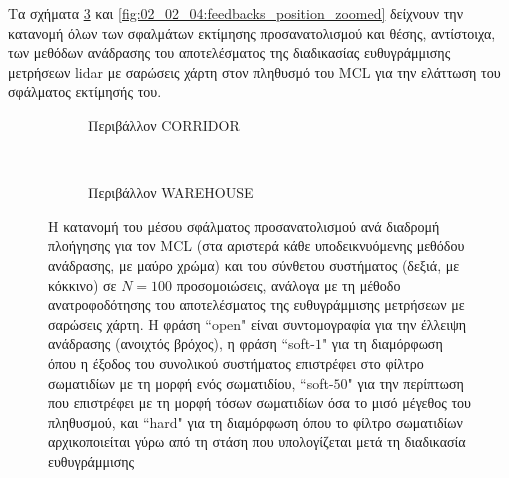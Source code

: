 Τα σχήματα \ref{fig:02_02_04:feedbacks_orientation_zoomed} και
\ref{fig:02_02_04:feedbacks_position_zoomed} δείχνουν την κατανομή όλων των
σφαλμάτων εκτίμησης προσανατολισμού και θέσης, αντίστοιχα, των μεθόδων ανάδρασης
του αποτελέσματος της διαδικασίας ευθυγράμμισης μετρήσεων lidar με σαρώσεις
χάρτη στον πληθυσμό του MCL για την ελάττωση του σφάλματος εκτίμησής του.

\begin{figure}
  \vspace{2cm}
  \begin{subfigure}{\linewidth}
  \hspace{-1.25cm}
    
    \vspace{0.3cm}
    \caption{Περιβάλλον CORRIDOR}
    \label{}
  \end{subfigure}\\
  \begin{subfigure}{\linewidth}\vspace{0.5cm}
    \hspace{-1.25cm}
    
    \vspace{0.3cm}
    \caption{Περιβάλλον WAREHOUSE}
    \label{}
    \end{subfigure}
\caption{\small Η κατανομή του μέσου σφάλματος προσανατολισμού ανά διαδρομή
         πλοήγησης για τον MCL (στα αριστερά κάθε υποδεικνυόμενης μεθόδου
         ανάδρασης, με μαύρο χρώμα) και του σύνθετου συστήματος (δεξιά, με
         κόκκινο) σε $N=100$ προσομοιώσεις, ανάλογα με τη μέθοδο
         ανατροφοδότησης του αποτελέσματος της ευθυγράμμισης μετρήσεων με
         σαρώσεις χάρτη. Η φράση ``open" είναι συντομογραφία για την έλλειψη
         ανάδρασης (ανοιχτός βρόχος), η φράση ``soft-$1$" για τη διαμόρφωση
         όπου η έξοδος του συνολικού συστήματος επιστρέφει στο φίλτρο
         σωματιδίων με τη μορφή ενός σωματιδίου, ``soft-$50$" για την περίπτωση
         που επιστρέφει με τη μορφή τόσων σωματιδίων όσα το μισό μέγεθος του
         πληθυσμού, και ``hard" για τη διαμόρφωση όπου το φίλτρο σωματιδίων
         αρχικοποιείται γύρω από τη στάση που υπολογίζεται μετά τη διαδικασία
         ευθυγράμμισης}
\label{fig:02_02_04:feedbacks_orientation_zoomed}
\end{figure}

